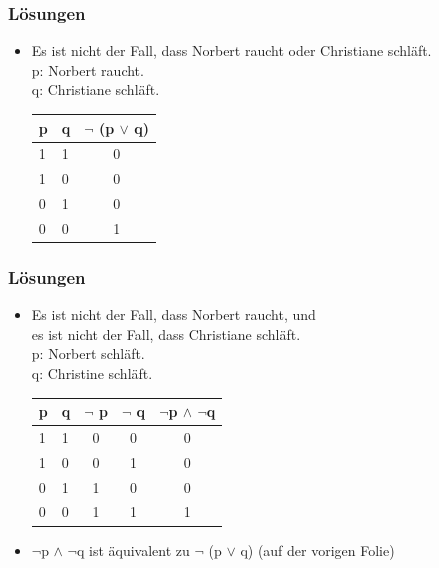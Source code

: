 \begin{frame}
\frametitle{Lösungen}


\begin{itemize}
\item[] Es ist nicht der Fall, dass Norbert raucht oder Christiane schläft.\\
p: Norbert raucht.\\
q: Christiane schläft.

\bigskip

\begin{tabular}{l|l|c}
p & q & $ \lnot $ (p $ \lor$ q)\\
\hline
1 & 1 & 0 \\
\hline
1 & 0 & 0 \\
\hline
0 & 1 & 0 \\
\hline
0 & 0 & 1 \\
\end{tabular}
\end{itemize}


\end{frame}

\begin{frame}
\frametitle{Lösungen}


\begin{itemize}
\item[] Es ist nicht der Fall, dass Norbert raucht, und\\
        es ist nicht der Fall, dass Christiane schläft.\\
p: Norbert schläft.\\
q: Christine schläft.

\bigskip

\begin{tabular}{l|l|c|c|c}
p & q & $\lnot$ p & $\lnot$ q & $ \lnot $p $ \land $ $ \lnot $q\\
\hline
1 & 1 & 0 & 0 & 0\\
\hline
1 & 0 & 0 & 1 & 0\\
\hline
0 & 1 & 1 & 0 & 0\\
\hline
0 & 0 & 1 & 1 & 1\\
\end{tabular}

\bigskip

\item[] $\lnot $p $ \land $ $ \lnot $q ist äquivalent zu $\lnot $ (p $ \lor$ q) (auf der vorigen Folie)

\end{itemize}

\end{frame}

